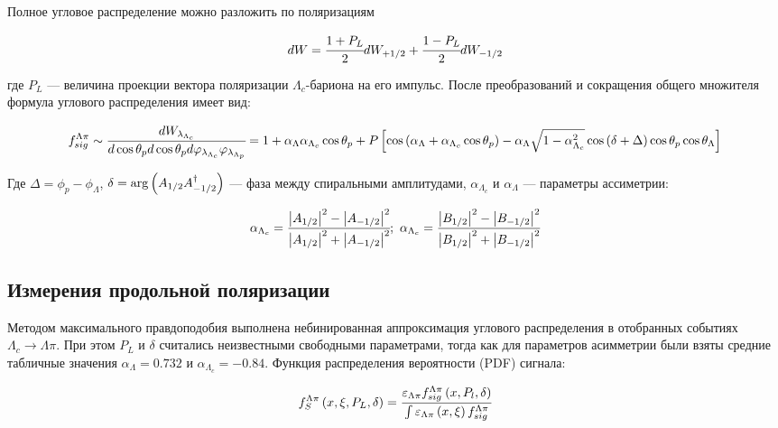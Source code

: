 Полное угловое распределение можно разложить по поляризациям

\begin{equation}
    dW = \cfrac{1+P_L}{2} dW_{+1/2} + \cfrac{1-P_L}{2} dW_{-1/2} 
\end{equation}

где $P_L$ — величина проекции вектора поляризации $\Lambda_c$-бариона 
на его импульс. После преобразований и сокращения общего множителя формула
углового распределения имеет вид:

\begin{equation}
    f_{sig}^{\Lambda\pi} \sim \cfrac{dW_{\lambda_{\Lambda_{c}}}}{d\cos{\theta_p}d\cos{\theta_p}d\varphi_{\lambda_{\Lambda_{c}}}\varphi_{\lambda_{\Lambda_{p}}}} 
    =
    1 + \alpha_{\Lambda}\alpha_{\Lambda_c} \cos \theta_p + 
    P\left[ \cos\left( \alpha_{\Lambda} + \alpha_{\Lambda_c} \cos{\theta_p} \right) - 
    \alpha_{\Lambda}\sqrt{1 - \alpha_{\Lambda_c}^2}\cos\left( \delta + \Delta \right)\cos\theta_p \cos \theta_\Lambda \right]
    \label{spin:Lam:pdf}
\end{equation}

Где $\Delta = \phi_p - \phi_\Lambda$, 
$\delta = \arg\left( A_{1/2}A_{-1/2}^\dag \right)$ --- фаза между спиральными амплитудами,
$\alpha_{\Lambda_c}$ и $\alpha_{\Lambda}$ --- параметры ассиметрии:

\begin{equation}
    \alpha_{\Lambda_c} = \cfrac{\abs{A_{1/2}}^2 - \abs{A_{-1/2}}^2}{\abs{A_{1/2}}^2 + \abs{A_{-1/2}}^2}; \
    \alpha_{\Lambda_c} = \cfrac{\abs{B_{1/2}}^2 - \abs{B_{-1/2}}^2}{\abs{B_{1/2}}^2 + \abs{B_{-1/2}}^2}
\end{equation}

\subsection{Измерения продольной поляризации}

Методом максимального правдоподобия выполнена небинированная
аппроксимация углового распределения в отобранных событиях 
$\Lambda_c \to \Lambda \pi$. При этом $P_L$ и $\delta$ считались
неизвестными свободными параметрами, тогда как для параметров асимметрии были 
взяты средние табличные значения 
$\alpha_{\Lambda} = 0.732$ и $\alpha_{\Lambda_c} = -0.84$. 
Функция распределения вероятности (PDF) сигнала:

\begin{equation}
    f_S^{\Lambda \pi} \left( x, \xi, P_L, \delta \right) = 
    \cfrac{\varepsilon_{\Lambda\pi}f_{sig}^{\Lambda\pi}\left( x, P_l, \delta \right)}{\int \varepsilon_{\Lambda\pi} \left( x, \xi \right) f_{sig}^{\Lambda\pi}}
\end{equation}

